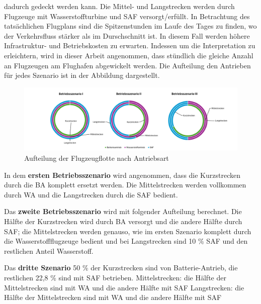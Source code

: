 dadurch gedeckt werden kann. Die Mittel- und Langstrecken werden durch Flugzeuge mit Wasserstoffturbine und SAF versorgt/erfüllt.
%
In Betrachtung des tatsächlichen Flugplans sind die Spitzenstunden im Laufe des Tages zu finden, wo
der Verkehrsfluss stärker als im Durschschnitt ist. In diesem Fall werden höhere Infrastruktur- und Betriebskosten zu erwarten.
Indessen um die Interpretation zu erleichtern, wird in dieser Arbeit angenommen, dass stündlich die gleiche Anzahl an Flugzeugen 
am Flughafen abgewickelt werden. 
%
Die Aufteilung den Antrieben für jedes Szenario ist in der Abbildung \cite{betriebsszenarien} dargestellt.
%
\begin{figure}[h]
	\centering
	\includegraphics[width=1.0\linewidth]{Bilder/Betriebsszenarien.png}
	\caption[Betriebsszenarien]{Aufteilung der Flugzeugflotte nach Antriebsart}
	\label{betriebsszenarien}
\end{figure}

In dem \textbf{ersten Betriebsszenario} wird angenommen, dass die Kurzstrecken durch die BA komplett ersetzt werden.
Die Mittelstrecken werden vollkommen durch WA und die Langstrecken durch die SAF bedient.

Das \textbf{zweite Betriebsszenario} wird mit folgender Aufteilung berechnet. 
Die Hälfte der Kurzstrecken wird durch BA versorgt und die andere Hälfte durch SAF; 
die Mittelstrecken werden genauso, wie im ersten Szenario komplett durch die Wasserstoffflugzeuge bedient und 
bei Langstrecken sind 10 \% SAF und den restlichen Anteil Wasserstoff.

Das \textbf{dritte Szenario} 50 \% der Kurzstrecken sind von Batterie-Antrieb, die restlichen 22,8 \% sind mit SAF betrieben.
Mittelstrecken: die Hälfte der Mittelstrecken sind mit WA und die andere Hälfte mit SAF
Langstrecken: die Hälfte der Mittelstrecken sind mit WA und die andere Hälfte mit SAF

